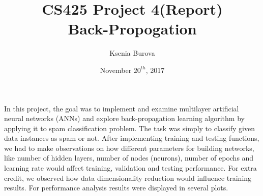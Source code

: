 \documentclass[12pt, letterpaper]{article}
\title{CS425 Project 4(Report)\\Back-Propogation}
\author{Ksenia Burova}
\date{November \(20^{th}\), 2017}
\begin{document}
\maketitle

 In this project, the goal was to implement and examine multilayer artificial neural networks (ANNs) and explore back-propagation learning algorithm by applying it to spam classification problem. The task was simply to classify given data instances as spam or not. After implementing training and testing functions, we had to make observations on how different parameters for building networks, like number of hidden layers, number of nodes (neurons), number of epochs and learning rate would affect training, validation and testing performance. For extra credit, we observed how data dimensionality reduction would influence training results. For performance analysis results were displayed in several plots.
\end{document}
